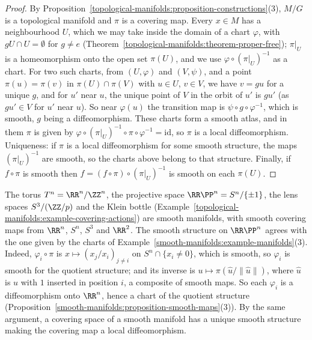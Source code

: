 \begin{proof}
By Proposition~\ref{topological-manifolds:proposition-constructions}(3), $M/G$ is a topological manifold and $\pi$ is a covering map. Every $x \in M$ has a neighbourhood $U$, which we may take inside the domain of a chart
$\varphi$, with $gU \cap U = \emptyset$ for $g \neq e$ (Theorem~\ref{topological-manifolds:theorem-proper-free}); $\pi|_U$ is a homeomorphism onto the open set $\pi(U)$, and we use $\varphi \circ (\pi|_U)^{-1}$ as a chart. For two
such charts, from $(U, \varphi)$ and $(V, \psi)$, and a point $\pi(u) = \pi(v)$ in $\pi(U) \cap \pi(V)$ with $u \in U$, $v \in V$, we have $v = gu$ for a unique $g$, and for $u'$ near $u$, the unique point of $V$ in the orbit of $u'$ is $gu'$
(as $gu' \in V$ for $u'$ near $u$). So near $\varphi(u)$ the transition map is $\psi \circ g \circ \varphi^{-1}$, which is smooth, $g$ being a diffeomorphism. These charts form a smooth atlas, and in them $\pi$ is given by
$\varphi \circ (\pi|_U)^{-1} \circ \pi \circ \varphi^{-1} = \mathrm{id}$, so $\pi$ is a local diffeomorphism. Uniqueness: if $\pi$ is a local diffeomorphism for some smooth structure, the maps $(\pi|_U)^{-1}$ are smooth, so the charts above
belong to that structure. Finally, if $f \circ \pi$ is smooth then $f = (f \circ \pi) \circ (\pi|_U)^{-1}$ is smooth on each $\pi(U)$.
\end{proof}

\begin{example}\label{smooth-manifolds:example-smooth-quotients}
The torus $T^n = \RR^n/\ZZ^n$, the projective space $\RR\PP^n = S^n/\{\pm1\}$, the lens spaces $S^3/(\ZZ/p)$ and the Klein bottle
(Example~\ref{topological-manifolds:example-covering-actions}) are smooth manifolds, with smooth covering maps from $\RR^n$, $S^n$, $S^3$ and $\RR^2$. The smooth
structure on $\RR\PP^n$ agrees with the one given by the charts of Example~\ref{smooth-manifolds:example-manifolds}(3). Indeed, $\varphi_i \circ \pi$ is
$x \mapsto (x_j/x_i)_{j \neq i}$ on $S^n \cap \{x_i \neq 0\}$, which is smooth, so $\varphi_i$ is smooth for the quotient structure; and its inverse is
$u \mapsto \pi(\hat{u}/\|\hat{u}\|)$, where $\hat{u}$ is $u$ with $1$ inserted in position $i$, a composite of smooth maps. So each $\varphi_i$ is a diffeomorphism
onto $\RR^n$, hence a chart of the quotient structure (Proposition~\ref{smooth-manifolds:proposition-smooth-maps}(3)). By the same argument, a covering space of a
smooth manifold has a unique smooth structure making the covering map a local diffeomorphism.
\end{example}

